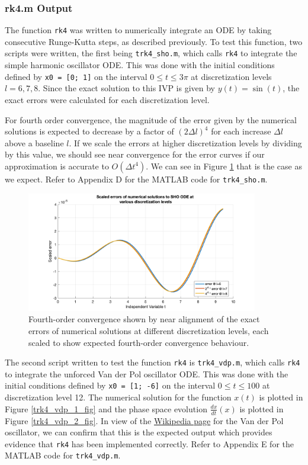 \documentclass[10pt]{article}
\def\code#1{\texttt{#1}} %
\begin{document}
\subsubsection*{rk4.m Output}

The function \code{rk4} was written to numerically integrate an ODE by taking consecutive 
Runge-Kutta steps, as described previously. To test this function, two scripts were written, the 
first being \code{trk4\_sho.m}, which calls \code{rk4} to integrate the simple harmonic oscillator 
ODE. This was done with the initial conditions defined by \code{x0 = [0; 1]} on the interval 
$0 \leq t \leq 3\pi$ at discretization levels $l = 6, 7, 8$. Since the exact solution to this IVP
is given by $y(t) = \sin(t)$, the exact errors were calculated for each discretization level.

For fourth order convergence, the magnitude of the error given by the numerical solutions is expected 
to decrease by a factor of $(2 \Delta l)^4$ for each increase $\Delta l$ above a baseline $l$. If we 
scale the errors at higher discretization levels by dividing by this value, we should see near 
convergence for the error curves if our approximation is accurate to $O(\Delta t^4)$. We can see in 
Figure \ref{trk4_sho_2_fig} that is the case as we expect. Refer to Appendix D for the MATLAB code 
for \code{trk4\_sho.m}.

\begin{figure}[H]
\centering
\includegraphics[width=0.9\textwidth]{trk4_sho_2.png}
\caption{Fourth-order convergence shown by near alignment of the exact errors of numerical solutions 
at different discretization levels, each scaled to show expected fourth-order convergence behaviour.
}\label{trk4_sho_2_fig}
\end{figure}

The second script written to test the function \code{rk4} is \code{trk4\_vdp.m}, which calls \code{rk4} 
to integrate the unforced Van der Pol oscillator ODE. This was done with the initial conditions defined 
by \code{x0 = [1; -6]} on the interval $0 \leq t \leq 100$ at discretization level 12. The numerical 
solution for the function $x(t)$ is plotted in Figure \ref{trk4_vdp_1_fig} and the phase space 
evolution $\frac{dx}{dt}(x)$ is plotted in Figure \ref{trk4_vdp_2_fig}. In view of the 
\href{https://en.wikipedia.org/wiki/Van_der_Pol_oscillator}{Wikipedia page} for the Van der Pol 
oscillator, we can confirm that this is the expected output which provides evidence that \code{rk4} has 
been implemented correctly. Refer to Appendix E for the MATLAB code for \code{trk4\_vdp.m}.
\end{document}
